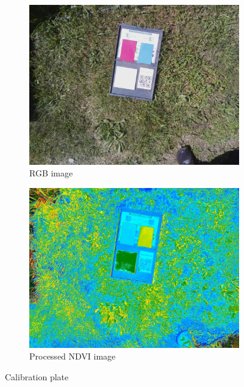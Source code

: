 \begin{figure}[H]
\begin{subfigure}{0.5\textwidth}
\centering
\includegraphics[scale=0.17]{images/rgb_cal.jpg}
\caption{RGB image}
\end{subfigure}
\begin{subfigure}{0.5\textwidth}
\centering
\includegraphics[scale=0.17]{images/ndvi_cal.jpg}
\caption{Processed NDVI image}
\end{subfigure}
\caption{Calibration plate}
\label{fig:cal_plate}
\end{figure}